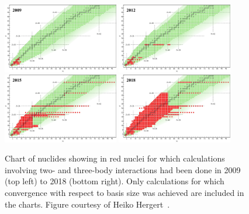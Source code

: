\begin{figure}[t]
  \centering
  \includegraphics[width=0.45\textwidth]{thesis/doc/images/external/nuclear_chart_2009.pdf}
  \hspace{0cm}
  \includegraphics[width=0.45\textwidth]{thesis/doc/images/external/nuclear_chart_2012.pdf}\\
  \vspace{0.05cm}
  \includegraphics[width=0.45\textwidth]{thesis/doc/images/external/nuclear_chart_2015.pdf}
  \hspace{0cm}
  \includegraphics[width=0.45\textwidth]{thesis/doc/images/external/nuclear_chart_2018.pdf}
  \caption[
    Chart of nuclides showing in red nuclei for which \abinitio{} calculations
    involving two- and three-body interactions had been done in 2009 (top left)
    to 2018 (bottom right).
    Only calculations for which convergence with respect to basis size was achieved
    are included in the charts.
  ]{
    Chart of nuclides showing in red nuclei for which \abinitio{} calculations
    involving two- and three-body interactions had been done in 2009 (top left)
    to 2018 (bottom right).
    Only calculations for which convergence with respect to basis size was achieved
    are included in the charts.
    Figure courtesy of Heiko Hergert~\cite{Herg15imsrgphysrep}.
  }\label{fig:ab_initio_conquest}
\end{figure}

